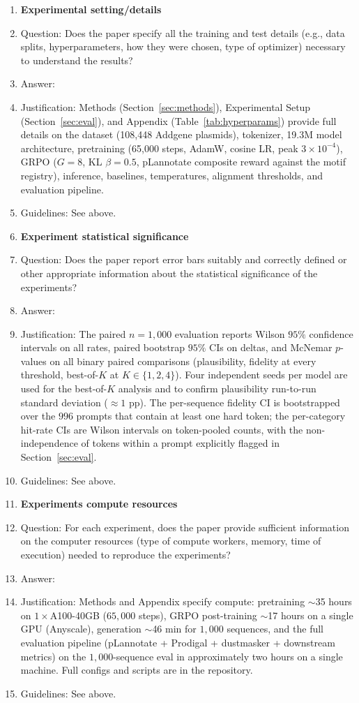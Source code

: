 \begin{enumerate}
\item {\bf Experimental setting/details}
    \item[] Question: Does the paper specify all the training and test details (e.g., data splits, hyperparameters, how they were chosen, type of optimizer) necessary to understand the results?
    \item[] Answer: \answerYes{}
    \item[] Justification: Methods (Section~\ref{sec:methods}), Experimental Setup (Section~\ref{sec:eval}), and Appendix (Table~\ref{tab:hyperparams}) provide full details on the dataset (108,448 Addgene plasmids), tokenizer, 19.3M model architecture, pretraining (65{,}000 steps, AdamW, cosine LR, peak $3\times10^{-4}$), GRPO ($G{=}8$, KL $\beta{=}0.5$, pLannotate composite reward against the motif registry), inference, baselines, temperatures, alignment thresholds, and evaluation pipeline.
    \item[] Guidelines: See above.

\item {\bf Experiment statistical significance}
    \item[] Question: Does the paper report error bars suitably and correctly defined or other appropriate information about the statistical significance of the experiments?
    \item[] Answer: \answerYes{}
    \item[] Justification: The paired $n{=}1{,}000$ evaluation reports Wilson $95\%$ confidence intervals on all rates, paired bootstrap $95\%$ CIs on deltas, and McNemar $p$-values on all binary paired comparisons (plausibility, fidelity at every threshold, best-of-$K$ at $K\in\{1,2,4\}$). Four independent seeds per model are used for the best-of-$K$ analysis and to confirm plausibility run-to-run standard deviation ($\approx 1$ pp). The per-sequence fidelity CI is bootstrapped over the $996$ prompts that contain at least one hard token; the per-category hit-rate CIs are Wilson intervals on token-pooled counts, with the non-independence of tokens within a prompt explicitly flagged in Section~\ref{sec:eval}.
    \item[] Guidelines: See above.

\item {\bf Experiments compute resources}
    \item[] Question: For each experiment, does the paper provide sufficient information on the computer resources (type of compute workers, memory, time of execution) needed to reproduce the experiments?
    \item[] Answer: \answerYes{}
    \item[] Justification: Methods and Appendix specify compute: pretraining $\sim$35 hours on $1{\times}$A100-40GB ($65{,}000$ steps), GRPO post-training $\sim$17 hours on a single GPU (Anyscale), generation $\sim$46 min for $1{,}000$ sequences, and the full evaluation pipeline (pLannotate + Prodigal + dustmasker + downstream metrics) on the $1{,}000$-sequence eval in approximately two hours on a single machine. Full configs and scripts are in the repository.
    \item[] Guidelines: See above.
    

\end{enumerate}
